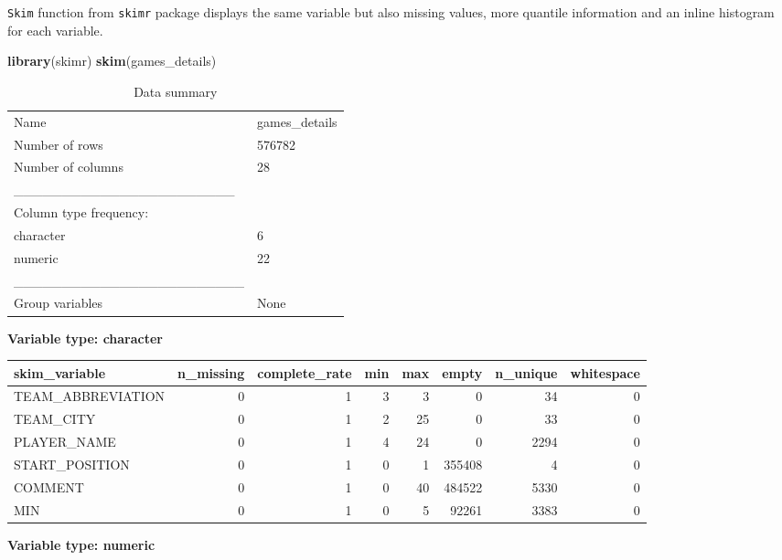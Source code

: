 \documentclass[
]{article}
\newenvironment{Shaded}{\begin{snugshade}}{\end{snugshade}}
\newcommand{\KeywordTok}[1]{\textcolor[rgb]{0.13,0.29,0.53}{\textbf{#1}}}
\newcommand{\NormalTok}[1]{#1}
\begin{document}
\texttt{Skim} function from \texttt{skimr} package displays the same
variable but also missing values, more quantile information and an
inline histogram for each variable.

\begin{Shaded}
\begin{Highlighting}[]
\KeywordTok{library}\NormalTok{(skimr)}
\KeywordTok{skim}\NormalTok{(games\_details)}
\end{Highlighting}
\end{Shaded}

\begin{longtable}[]{@{}ll@{}}
\caption{Data summary}\tabularnewline
\toprule
\endhead
Name & games\_details\tabularnewline
Number of rows & 576782\tabularnewline
Number of columns & 28\tabularnewline
\_\_\_\_\_\_\_\_\_\_\_\_\_\_\_\_\_\_\_\_\_\_\_ &\tabularnewline
Column type frequency: &\tabularnewline
character & 6\tabularnewline
numeric & 22\tabularnewline
\_\_\_\_\_\_\_\_\_\_\_\_\_\_\_\_\_\_\_\_\_\_\_\_ &\tabularnewline
Group variables & None\tabularnewline
\bottomrule
\end{longtable}

\textbf{Variable type: character}

\begin{longtable}[]{@{}lrrrrrrr@{}}
\toprule
skim\_variable & n\_missing & complete\_rate & min & max & empty &
n\_unique & whitespace\tabularnewline
\midrule
\endhead
TEAM\_ABBREVIATION & 0 & 1 & 3 & 3 & 0 & 34 & 0\tabularnewline
TEAM\_CITY & 0 & 1 & 2 & 25 & 0 & 33 & 0\tabularnewline
PLAYER\_NAME & 0 & 1 & 4 & 24 & 0 & 2294 & 0\tabularnewline
START\_POSITION & 0 & 1 & 0 & 1 & 355408 & 4 & 0\tabularnewline
COMMENT & 0 & 1 & 0 & 40 & 484522 & 5330 & 0\tabularnewline
MIN & 0 & 1 & 0 & 5 & 92261 & 3383 & 0\tabularnewline
\bottomrule
\end{longtable}

\textbf{Variable type: numeric}
\end{document}
